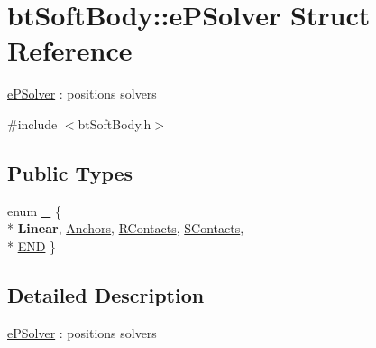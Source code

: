 \hypertarget{structbt_soft_body_1_1e_p_solver}{\section{bt\+Soft\+Body\+:\+:e\+P\+Solver Struct Reference}
\label{structbt_soft_body_1_1e_p_solver}
}


\hyperlink{structbt_soft_body_1_1e_p_solver}{e\+P\+Solver} \+: positions solvers  




{\ttfamily \#include $<$bt\+Soft\+Body.\+h$>$}

\subsection*{Public Types}
\begin{DoxyCompactItemize}
\item 
enum \hyperlink{structbt_soft_body_1_1e_p_solver_a5d6ab41a09da7333bc2047b4ea14bf86}{\+\_\+} \{ \\*
{\bfseries Linear}, 
\hyperlink{structbt_soft_body_1_1e_p_solver_a5d6ab41a09da7333bc2047b4ea14bf86ad1de203597e3f891a95c3aaf4f805e84}{Anchors}, 
\hyperlink{structbt_soft_body_1_1e_p_solver_a5d6ab41a09da7333bc2047b4ea14bf86a18826149c80118f73e906b4966c69891}{R\+Contacts}, 
\hyperlink{structbt_soft_body_1_1e_p_solver_a5d6ab41a09da7333bc2047b4ea14bf86a1ff50fff0983fbc2e4ae19997d7bfb4e}{S\+Contacts}, 
\\*
\hyperlink{structbt_soft_body_1_1e_p_solver_a5d6ab41a09da7333bc2047b4ea14bf86af5b5c91f8cb6d3d29ee7bb11e1ce5610}{E\+N\+D}
 \}
\end{DoxyCompactItemize}


\subsection{Detailed Description}
\hyperlink{structbt_soft_body_1_1e_p_solver}{e\+P\+Solver} \+: positions solvers 


